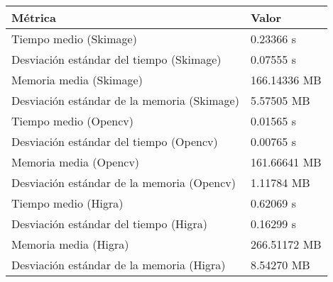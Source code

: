 \begin{tabular} { m{9cm} | m{2cm}  }
\textbf{Métrica} & \textbf{Valor} \\
\midrule
Tiempo medio (Skimage) & 0.23366 s \\
Desviación estándar del tiempo (Skimage) & 0.07555 s \\
Memoria media (Skimage) & 166.14336 MB \\
Desviación estándar de la memoria (Skimage) & 5.57505 MB \\
Tiempo medio (Opencv) & 0.01565 s \\
Desviación estándar del tiempo (Opencv) & 0.00765 s \\
Memoria media (Opencv) & 161.66641 MB \\
Desviación estándar de la memoria (Opencv) & 1.11784 MB \\
Tiempo medio (Higra) & 0.62069 s \\
Desviación estándar del tiempo (Higra) & 0.16299 s \\
Memoria media (Higra) & 266.51172 MB \\
Desviación estándar de la memoria (Higra) & 8.54270 MB \\
\bottomrule
\end{tabular}
